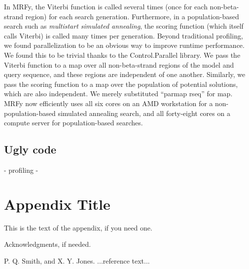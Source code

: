 \documentclass[preprint]{sigplanconf}
\begin{document}
In MRFy, the Viterbi function is called several times (once for each 
non-beta-strand region) for each search generation. Furthermore, in a 
population-based search such as \textit{multistart simulated annealing}, the 
scoring function (which itself calls Viterbi) is called many times per 
generation. Beyond traditional profiling, we found parallelization to be an 
obvious way to improve runtime performance. We found this to be trivial thanks 
to the Control.Parallel library. We pass the Viterbi function to a map over all 
non-beta-strand regions of the model and query sequence, and these regions are 
independent of one another. Similarly, we pass the scoring function to a map 
over the population of potential solutions, which are also independent. We 
merely substituted ``parmap rseq'' for map. MRFy now efficiently uses all six 
cores on an AMD workstation for a non-population-based simulated annealing 
search, and all forty-eight cores on a compute server for population-based 
searches.









\subsection{Ugly code}

- profiling
- 


\appendix
\section{Appendix Title}

This is the text of the appendix, if you need one.

\acks

Acknowledgments, if needed.





\begin{thebibliography}{}
\softraggedright

P. Q. Smith, and X. Y. Jones. ...reference text...

\end{thebibliography}
\end{document}
